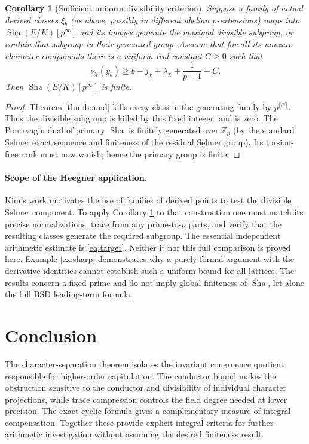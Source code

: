 \documentclass[11pt]{article}
\newtheorem{corollary}[theorem]{Corollary}
\theoremstyle{definition}\newtheorem{definition}[theorem]{Definition}\newtheorem{example}[theorem]{Example}
\theoremstyle{remark}\newtheorem{remark}[theorem]{Remark}
\newcommand{\Zp}{\mathbb Z_p}\newcommand{\Qp}{\mathbb Q_p}\newcommand{\Fp}{\mathbb F_p}
\newcommand{\Sha}{\mathop{\mathrm{Sha}}}\newcommand{\Gal}{\operatorname{Gal}}\newcommand{\ord}{\operatorname{ord}}\newcommand{\Tr}{\operatorname{Tr}}\newcommand{\im}{\operatorname{im}}\newcommand{\rk}{\operatorname{rank}}
\begin{document}
\begin{corollary}[Sufficient uniform divisibility criterion]\label{cor:fin}
Suppose a family of actual derived classes $\xi_b$ (as above, possibly in different abelian $p$-extensions) maps into $\Sha(E/K)[p^\infty]$ and its images generate the maximal divisible subgroup, or contain that subgroup in their generated group. Assume that for all its nonzero character components there is a uniform real constant $C\ge0$ such that
\begin{equation}\label{eq:target}
 \nu_\chi(y_b)\ge b-j_\chi+\lambda_\chi+\frac1{p-1}-C.
\end{equation}
Then $\Sha(E/K)[p^\infty]$ is finite.
\end{corollary}
\begin{proof}
Theorem \ref{thm:bound} kills every class in the generating family by $p^{\lceil C\rceil}$. Thus the divisible subgroup is killed by this fixed integer, and is zero. The Pontryagin dual of primary $\Sha$ is finitely generated over $\Zp$ (by the standard Selmer exact sequence and finiteness of the residual Selmer group). Its torsion-free rank must now vanish; hence the primary group is finite.
\end{proof}

\paragraph{Scope of the Heegner application.} Kim's work \cite{kim} motivates the use of families of derived points to test the divisible Selmer component. To apply Corollary \ref{cor:fin} to that construction one must match its precise normalizations, trace from any prime-to-$p$ parts, and verify that the resulting classes generate the required subgroup. The essential independent arithmetic estimate is \eqref{eq:target}. Neither it nor this full comparison is proved here. Example \ref{ex:sharp} demonstrates why a purely formal argument with the derivative identities cannot establish such a uniform bound for all lattices. The results concern a fixed prime and do not imply global finiteness of $\Sha$, let alone the full BSD leading-term formula.

\section*{Conclusion}
The character-separation theorem isolates the invariant congruence quotient responsible for higher-order capitulation. The conductor bound makes the obstruction sensitive to the conductor and divisibility of individual character projections, while trace compression controls the field degree needed at lower precision. The exact cyclic formula gives a complementary measure of integral compensation. Together these provide explicit integral criteria for further arithmetic investigation without assuming the desired finiteness result.
\end{document}
